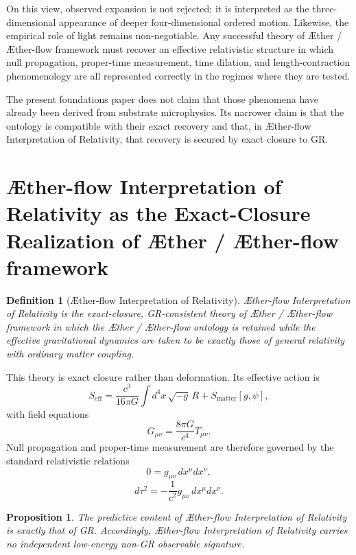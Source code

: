 \documentclass[11pt]{article}
\newcommand{\Aether}{\AE{}ther}
\newcommand{\Aflow}{\AE{}ther-flow}
\newcommand{\TheoryName}{\Aflow{} Interpretation of Relativity}
\newcommand{\TheoryProgram}{\Aether{} / \Aflow{} framework}
\newtheorem{definition}{Definition}
\newtheorem{proposition}{Proposition}
\begin{document}
On this view, observed expansion is not rejected; it is interpreted as the three-dimensional appearance of deeper four-dimensional ordered motion. Likewise, the empirical role of light remains non-negotiable. Any successful theory of \TheoryProgram{} must recover an effective relativistic structure in which null propagation, proper-time measurement, time dilation, and length-contraction phenomenology are all represented correctly in the regimes where they are tested.

The present foundations paper does not claim that those phenomena have already been derived from substrate microphysics. Its narrower claim is that the ontology is compatible with their exact recovery and that, in \TheoryName{}, that recovery is secured by exact closure to GR.

\section{\TheoryName{} as the Exact-Closure Realization of \TheoryProgram{}}

\begin{definition}[\TheoryName{}]
\TheoryName{} is the exact-closure, GR-consistent theory of \TheoryProgram{} in which the \Aether{} / \Aflow{} ontology is retained while the effective gravitational dynamics are taken to be exactly those of general relativity with ordinary matter coupling.
\end{definition}

This theory is exact closure rather than deformation. Its effective action is
\begin{equation}
S_{\mathrm{eff}}
=
\frac{c^3}{16\pi G}\int d^4x\,\sqrt{-g}\,R
+
S_{\mathrm{matter}}[g,\psi],
\label{eq:SA}
\end{equation}
with field equations
\begin{equation}
G_{\mu\nu} = \frac{8\pi G}{c^4} T_{\mu\nu}.
\label{eq:einstein}
\end{equation}
Null propagation and proper-time measurement are therefore governed by the standard relativistic relations
\begin{equation}
0 = g_{\mu\nu}\,dx^{\mu}dx^{\nu},
\label{eq:null}
\end{equation}
\begin{equation}
d\tau^2 = -\frac{1}{c^2} g_{\mu\nu}\,dx^{\mu}dx^{\nu}.
\label{eq:propertime}
\end{equation}

\begin{proposition}
The predictive content of \TheoryName{} is exactly that of GR. Accordingly, \TheoryName{} carries no independent low-energy non-GR observable signature.
\end{proposition}
\end{document}
